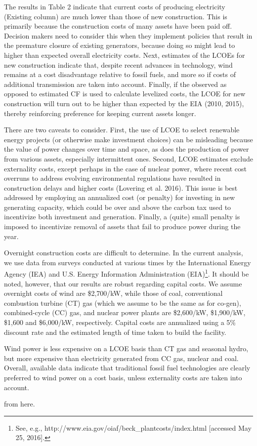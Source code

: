 The results in Table 2 indicate that current costs of producing electricity (Existing column) are much lower than those of new construction. This is primarily because the construction costs of many assets have been paid off. Decision makers need to consider this when they implement policies that result in the premature closure of existing generators, because doing so might lead to higher than expected overall electricity costs. Next, estimates of the LCOEs for new construction indicate that, despite recent advances in technology, wind remains at a cost disadvantage relative to fossil fuels, and more so if costs of additional transmission are taken into account. Finally, if the observed as opposed to estimated CF is used to calculate levelized costs, the LCOE for new construction will turn out to be higher than expected by the EIA (2010, 2015), thereby reinforcing preference for keeping current assets longer. 


There are two caveats to consider. First, the use of LCOE to select renewable energy projects (or otherwise make investment choices) can be misleading because the value of power changes over time and space, as does the production of power from various assets, especially intermittent ones. Second, LCOE estimates exclude externality costs, except perhaps in the case of nuclear power, where recent cost overruns to address evolving environmental regulations have resulted in construction delays and higher costs (Lovering et al. 2016). This issue is best addressed by employing an annualized cost (or penalty) for investing in new generating capacity, which could be over and above the carbon tax used to incentivize both investment and generation. Finally, a (quite) small penalty is imposed to incentivize removal of assets that fail to produce power during the year.


Overnight construction costs are difficult to determine. In the current analysis, we use data from surveys conducted at various times by the International Energy Agency (IEA) and U.S. Energy Information Administration (EIA)\footnote{See, e.g., http://www.eia.gov/oiaf/beck\_plantcosts/index.html [accessed May 25, 2016]. }. It should be noted, however, that our results are robust regarding capital costs.  We assume overnight costs of wind are \$2,700/kW, while those of coal, conventional combustion turbine (CT) gas (which we assume to be the same as for co-gen), combined-cycle (CC) gas, and nuclear power plants are \$2,600/kW, \$1,900/kW, \$1,600 and \$6,000/kW, respectively. Capital costs are annualized using a 5\% discount rate and the estimated length of time taken to build the facility.


Wind power is less expensive on a LCOE basis than CT gas and seasonal hydro, but more expensive than electricity generated from CC gas, nuclear and coal. Overall, available data indicate that traditional fossil fuel technologies are clearly preferred to wind power on a cost basis, unless externality costs are taken into account.


\citet{Bordo2005} from here.